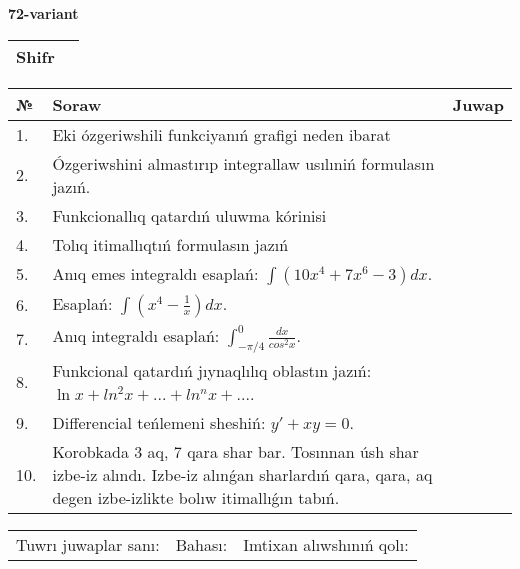 \documentclass{article}
\begin{document}
  \egroup
  
  \newpage
  
  
  \textbf{72-variant}\\
  
  \bgroup
  \def\arraystretch{1.6} %
  
  \begin{tabular}{|m{5.7cm}|m{9.5cm}|}
  \hline
  Shifr & \\
  \hline
  \end{tabular}
  
  \vspace{1cm}
  
  \begin{tabular}{|m{0.7cm}|m{10cm}|m{4cm}|}
  \hline
  № & Soraw & Juwap \\
  \hline
  1. & Eki ózgeriwshili funkciyanıń grafigi neden ibarat &  \\
  \hline
  2. & Ózgeriwshini almastırıp integrallaw usılıniń formulasın jazıń. &  \\
  \hline
  3. & Funkcionallıq qatardıń uluwma kórinisi &  \\
  \hline
  4. & Tolıq itimallıqtıń formulasın jazıń &  \\
  \hline
  5. & Anıq emes integraldı esaplań: \(\int{\left( 10x^{4} + 7x^{6} - 3 \right)dx}\). &  \\
  \hline
  6. & Esaplań: \(\int\left( x^{4} - \frac{1}{x} \right)dx\). &  \\
  \hline
  7. & Anıq integraldı esaplań: \(\int_{- \pi/4}^{0}\frac{dx}{cos^2 x}\). &  \\
  \hline
  8. & Funkcional qatardıń jıynaqlılıq oblastın jazıń: \(\ln x + ln^2 x + ... + ln^{n}x + ...\). &  \\
  \hline
  9. & Differencial teńlemeni sheshiń: \(y' + xy = 0\). &  \\
  \hline
  10. & Korobkada 3 aq, 7 qara shar bar. Tosınnan úsh shar izbe-iz alındı. Izbe-iz alınǵan sharlardıń qara, qara, aq degen izbe-izlikte bolıw itimallıǵın tabıń. &  \\
  \hline
  \end{tabular}
  
  \vspace{1cm}
  
  \begin{tabular}{lll}
  Tuwrı juwaplar sanı: \underline{\hspace{1.5cm}} & 
  Bahası: \underline{\hspace{1.5cm}} & 
  Imtixan alıwshınıń qolı: \underline{\hspace{2cm}} \\
  \end{tabular}
  
\end{document}
